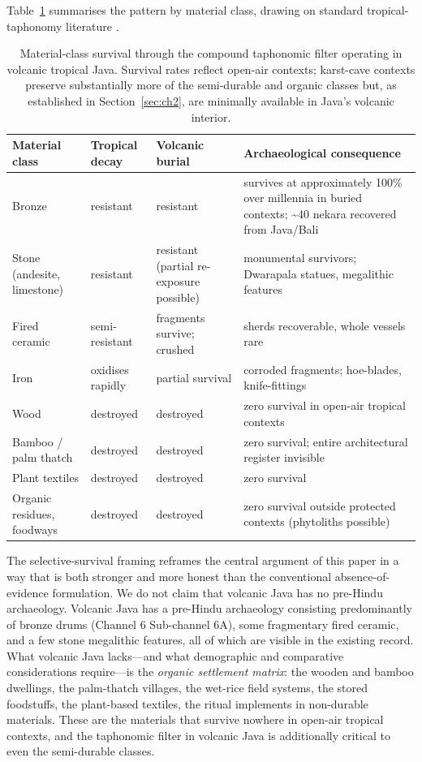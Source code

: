 \documentclass[12pt,a4paper]{article}
\begin{document}
Table~\ref{tab:survival_matrix} summarises the pattern by material class, drawing on standard tropical-taphonomy literature \citep{erasmus2005}.

\begin{table}[t]
\caption{Material-class survival through the compound taphonomic filter operating in volcanic tropical Java. Survival rates reflect open-air contexts; karst-cave contexts preserve substantially more of the semi-durable and organic classes but, as established in Section~\ref{sec:ch2}, are minimally available in Java's volcanic interior.}
\label{tab:survival_matrix}
\begin{tabular}{p{3.5cm}p{2cm}p{2cm}p{5.5cm}}
\toprule
Material class & Tropical decay & Volcanic burial & Archaeological consequence \\
\midrule
Bronze & resistant & resistant & survives at approximately 100\% over millennia in buried contexts; \textasciitilde40 nekara recovered from Java/Bali \\
Stone (andesite, limestone) & resistant & resistant (partial re-exposure possible) & monumental survivors; Dwarapala statues, megalithic features \\
Fired ceramic & semi-resistant & fragments survive; crushed & sherds recoverable, whole vessels rare \\
Iron & oxidises rapidly & partial survival & corroded fragments; hoe-blades, knife-fittings \\
Wood & destroyed & destroyed & zero survival in open-air tropical contexts \\
Bamboo / palm thatch & destroyed & destroyed & zero survival; entire architectural register invisible \\
Plant textiles & destroyed & destroyed & zero survival \\
Organic residues, foodways & destroyed & destroyed & zero survival outside protected contexts (phytoliths possible) \\
\bottomrule
\end{tabular}
\end{table}

The selective-survival framing reframes the central argument of this paper in a way that is both stronger and more honest than the conventional absence-of-evidence formulation. We do not claim that volcanic Java has no pre-Hindu archaeology. Volcanic Java has a pre-Hindu archaeology consisting predominantly of bronze drums (Channel 6 Sub-channel 6A), some fragmentary fired ceramic, and a few stone megalithic features, all of which are visible in the existing record. What volcanic Java lacks---and what demographic and comparative considerations require---is the \textit{organic settlement matrix}: the wooden and bamboo dwellings, the palm-thatch villages, the wet-rice field systems, the stored foodstuffs, the plant-based textiles, the ritual implements in non-durable materials. These are the materials that survive nowhere in open-air tropical contexts, and the taphonomic filter in volcanic Java is additionally critical to even the semi-durable classes.
\end{document}
